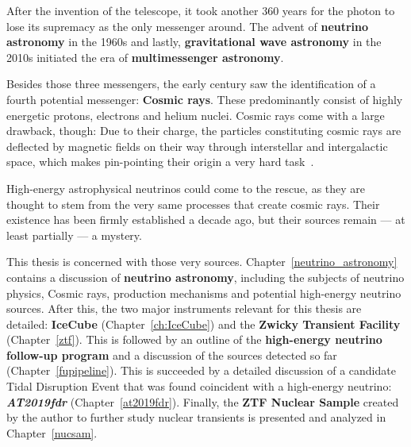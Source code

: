 After the invention of the telescope, it took another 360 years for the photon to lose its supremacy as the only messenger around. The advent of \textbf{neutrino astronomy} in the 1960s and lastly, \textbf{gravitational wave astronomy} in the 2010s initiated the era of \textbf{multimessenger astronomy}.

Besides those three messengers, the early  century saw the identification of a fourth potential messenger: \textbf{Cosmic rays}. These predominantly consist of highly energetic protons, electrons and helium nuclei. Cosmic rays come with a large drawback, though: Due to their charge, the particles constituting cosmic rays are deflected by magnetic fields on their way through interstellar and intergalactic space, which makes pin-pointing their origin a very hard task~\cite{Beckman2021}.

High-energy astrophysical neutrinos could come to the rescue, as they are thought to stem from the very same processes that create cosmic rays. Their existence has been firmly established a decade ago, but their sources remain --- at least partially --- a mystery.

This thesis is concerned with those very sources. Chapter~\ref{neutrino_astronomy} contains a discussion of \textbf{neutrino astronomy}, including the subjects of neutrino physics, Cosmic rays, production mechanisms and potential high-energy neutrino sources. After this, the two major instruments relevant for this thesis are detailed: \textbf{IceCube} (Chapter~\ref{ch:IceCube}) and the \textbf{Zwicky Transient Facility} (Chapter~\ref{ztf}). This is followed by an outline of the \textbf{high-energy neutrino follow-up program} and a discussion of the sources detected so far (Chapter~\ref{fupipeline}). This is succeeded by a detailed discussion of a candidate Tidal Disruption Event that was found coincident with a high-energy neutrino: \textbf{\textit{AT2019fdr}} (Chapter~\ref{at2019fdr}). Finally, the \textbf{ZTF Nuclear Sample} created by the author to further study nuclear transients is presented and analyzed in Chapter~\ref{nucsam}.